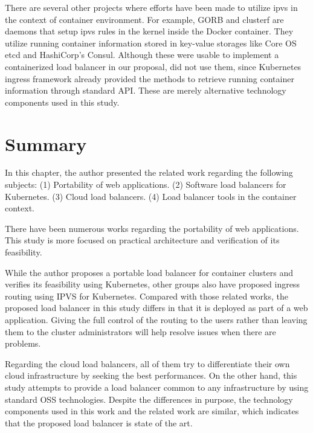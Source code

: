 There are several other projects where efforts have been made to utilize ipvs in the context of container environment.
For example, GORB\cite{Sibiryov2015} and clusterf\cite{Aaltodoc:http://urn.fi/URN:NBN:fi:aalto-201611025433} are daemons 
that setup ipvs rules in the kernel inside the Docker container. 
They utilize running container information stored in key-value storages
like Core OS etcd\cite{CoreOSEtcd} and HashiCorp's Consul\cite{HashiCorpConsul}. 
Although these were usable to implement a containerized load balancer in our proposal,  did not use them, 
since Kubernetes ingress framework already provided the methods to retrieve running container information through standard API.
These are merely alternative technology components used in this study.

\section{Summary}

In this chapter, the author presented the related work regarding the following subjects:
(1) Portability of web applications.
(2) Software load balancers for Kubernetes.
(3) Cloud load balancers.
(4) Load balancer tools in the container context.

There have been numerous works regarding the portability of web applications.
This study is more focused on practical architecture and verification of its feasibility.

While the author proposes a portable load balancer for container clusters and verifies its feasibility using Kubernetes, 
other groups also have proposed ingress routing using IPVS for Kubernetes.
Compared with those related works, the proposed load balancer in this study differs in that it is deployed as part of a web application.
Giving the full control of the routing to the users rather than leaving them to the cluster administrators will help resolve issues when there are problems.

Regarding the cloud load balancers, all of them try to differentiate their own cloud infrastructure by seeking the best performances.
On the other hand, this study attempts to provide a load balancer common to any infrastructure by using standard OSS technologies.
Despite the differences in purpose, the technology components used in this work and the related work are similar, which indicates that the proposed load balancer is state of the art.
